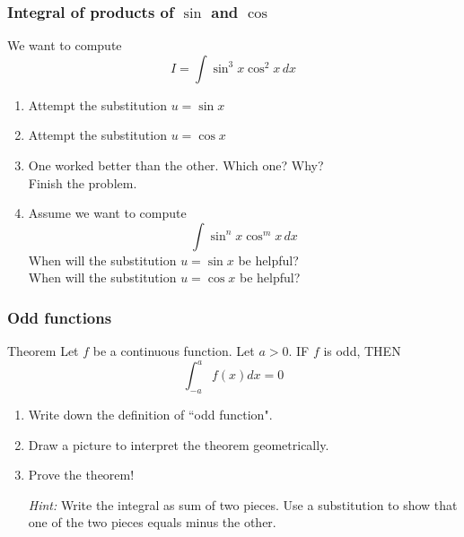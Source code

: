 \begin{frame}[t]
	\fontsize{13}{13}\selectfont
	\frametitle{Integral of products of $\sin$ and $\cos$}
	We want to compute
	\vspace{-.5cm}
	\[
		I = \int \sin^{3}x \cos^{2}x \, dx
	\]

	\begin{enumerate}
		\item Attempt the substitution $\displaystyle u = \sin x$

		\item Attempt the substitution $\displaystyle u = \cos x$

		\item One worked better than the other. Which one? Why? \\ Finish the
			problem.

		\item Assume we want to compute
			\[
				\int \sin^{n}x \cos^{m}x \, dx
			\]
			When will the substitution $\displaystyle u = \sin x$ be helpful? \\ When
			will the substitution $\displaystyle u = \cos x$ be helpful?
	\end{enumerate}
\end{frame}

\begin{frame}[t]
	\fontsize{13}{13}\selectfont
	\frametitle{Odd functions}

	\begin{block}{Theorem}
		Let $f$ be a continuous function. Let $a >0$. IF $f$ is odd, THEN
		\[
			\int_{-a}^{a}f(x) dx = 0
		\]
	\end{block}


	\begin{enumerate}
		\item Write down the definition of ``odd function".

		\item Draw a picture to interpret the theorem geometrically.

		\item Prove the theorem!

			\emph{Hint:} Write the integral as sum of two pieces. Use a substitution to
			show that one of the two pieces equals minus the other.
	\end{enumerate}
\end{frame}

